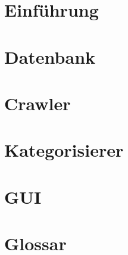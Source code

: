 

	\maketitle
	\setcounter{tocdepth}{1}
	\tableofcontents

	\chapter{Einführung}
			
	\chapter{Datenbank}
		
	\chapter{Crawler}
		
	\chapter{Kategorisierer}
		
	\chapter{GUI}
		
	\chapter{Glossar}
		

